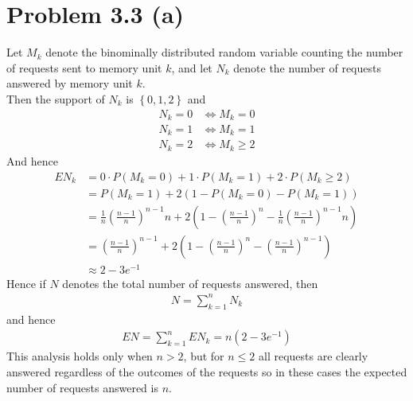 \section*{Problem 3.3 (a)}
Let $M_k$ denote the binominally distributed random variable counting the number of requests sent to memory unit $k$, 
and let $N_k$ denote the number of requests answered by memory unit $k$. \\
Then the support of $N_k$ is $\left\{ 0,1,2 \right\}$ and 
\begin{align*}
	N_k=0 & \iff  M_k=0 \\
	N_k=1 & \iff  M_k=1 \\
	N_k=2 & \iff  M_k \geq 2
\end{align*}
And hence
\begin{align*}
	EN_k & = 0 \cdot P(M_k=0)+1 \cdot P(M_k=1)+2 \cdot P(M_k \geq 2) \\
	&=P(M_k=1)+2(1-P(M_k=0)-P(M_k=1)) \\
	&= \frac{1}{n}(\frac{n-1}{n})^{n-1}n+2(1-\left( \frac{n-1}{n} \right)^n-\frac{1}{n}\left( \frac{n-1}{n} \right)^{n-1}n) \\
	&= \left( \frac{n-1}{n} \right)^{n-1}+2\left( 1-\left( \frac{n-1}{n} \right)^n-\left( \frac{n-1}{n} \right)^{n-1} \right) \\
	&\approx 2-3e^{-1}
\end{align*}
Hence if $N$ denotes the total number of requests answered, then 
\begin{align*}
	N= \sum_{k=1}^{n}N_k
\end{align*}
and hence
\begin{align*}
	EN=\sum_{k=1}^n EN_k=n\left( 2-3e^{-1} \right)
\end{align*}
This analysis holds only when $n>2$, but for $n\leq 2$ all requests are clearly answered regardless of the outcomes of the requests
so in these cases the expected number of requests answered is $n$.
